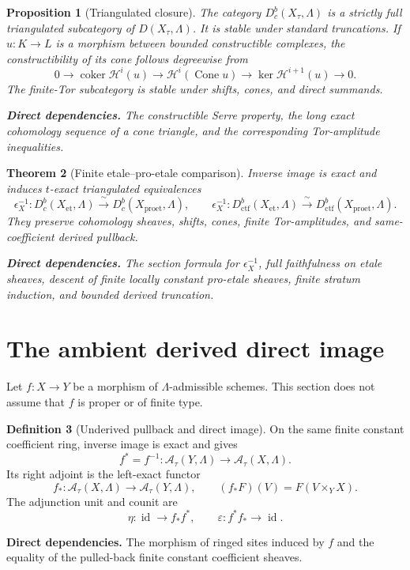 \documentclass[10pt]{article}
\newtheorem{theorem}{Theorem}[section]
\newtheorem{proposition}[theorem]{Proposition}
\theoremstyle{definition}
\newtheorem{definition}[theorem]{Definition}
\newcommand{\Dbc}{D^b_c}
\newcommand{\Dctf}{D^b_{\mathrm{ctf}}}
\newcommand{\deps}[1]{\par\smallskip\noindent\textbf{Direct dependencies.} #1}
\begin{document}
\begin{proposition}[Triangulated closure]
The category $\Dbc(X_\tau,\Lambda)$ is a strictly full triangulated
subcategory of $D(X_\tau,\Lambda)$.  It is stable under standard truncations.
If $u:K\to L$ is a morphism between bounded constructible complexes, the
constructibility of its cone follows degreewise from
\[
 0\longrightarrow\operatorname{coker}\mathcal H^{i}(u)
 \longrightarrow\mathcal H^i(\operatorname{Cone}u)
 \longrightarrow\ker\mathcal H^{i+1}(u)\longrightarrow0.
\]
The finite-Tor subcategory is stable under shifts, cones, and direct
summands.
\deps{The constructible Serre property, the long exact cohomology sequence
of a cone triangle, and the corresponding Tor-amplitude inequalities.}
\end{proposition}

\begin{theorem}[Finite etale--pro-etale comparison]
Inverse image is exact and induces $t$-exact triangulated equivalences
\[
 \epsilon_X^{-1}:\Dbc(X_{\mathrm{et}},\Lambda)
   \xrightarrow{\ \sim\ }
   \Dbc(X_{\mathrm{proet}},\Lambda),
 \qquad
 \epsilon_X^{-1}:\Dctf(X_{\mathrm{et}},\Lambda)
   \xrightarrow{\ \sim\ }
   \Dctf(X_{\mathrm{proet}},\Lambda).
\]
They preserve cohomology sheaves, shifts, cones, finite Tor-amplitudes, and
same-coefficient derived pullback.
\deps{The section formula for $\epsilon_X^{-1}$, full faithfulness on etale
sheaves, descent of finite locally constant pro-etale sheaves, finite
stratum induction, and bounded derived truncation.}
\end{theorem}

\section{The ambient derived direct image}

Let $f:X\to Y$ be a morphism of $\Lambda$-admissible schemes.  This section
does not assume that $f$ is proper or of finite type.

\begin{definition}[Underived pullback and direct image]
On the same finite constant coefficient ring, inverse image is exact and
gives
\[
 f^*=f^{-1}:\mathcal A_\tau(Y,\Lambda)\longrightarrow
              \mathcal A_\tau(X,\Lambda).
\]
Its right adjoint is the left-exact functor
\[
 f_*:\mathcal A_\tau(X,\Lambda)\longrightarrow
       \mathcal A_\tau(Y,\Lambda),
 \qquad
 (f_*F)(V)=F(V\times_YX).
\]
The adjunction unit and counit are
\[
 \eta:\operatorname{id}\longrightarrow f_*f^*,
 \qquad
 \varepsilon:f^*f_*\longrightarrow\operatorname{id}.
\]
\deps{The morphism of ringed sites induced by $f$ and the equality of the
pulled-back finite constant coefficient sheaves.}
\end{definition}
\end{document}
